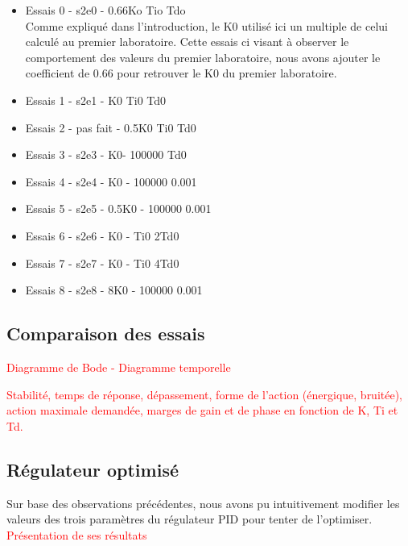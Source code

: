 \begin{itemize}
\item Essais 0 - s2e0 - 0.66Ko Tio Tdo\\
Comme expliqué dans l'introduction, le K0 utilisé ici un multiple de celui calculé au premier laboratoire. Cette essais ci visant à observer le comportement des valeurs du premier laboratoire, nous avons ajouter le coefficient de 0.66 pour retrouver le K0 du premier laboratoire.

\item Essais 1 - s2e1 - K0 Ti0 Td0

\item Essais 2 - pas fait - 0.5K0 Ti0 Td0 

\item Essais 3 - s2e3 - K0- 100000 Td0

\item Essais 4 - s2e4 - K0 - 100000 0.001

\item Essais 5 - s2e5 - 0.5K0 - 100000 0.001

\item Essais 6 - s2e6 - K0 - Ti0 2Td0

\item Essais 7 - s2e7 - K0 - Ti0 4Td0

\item Essais 8 - s2e8 - 8K0 - 100000 0.001
\end{itemize}

\subsection{Comparaison des essais}
\textcolor{red}{Diagramme de Bode - Diagramme temporelle\\}

\textcolor{red}{Stabilité, temps de réponse, dépassement, forme de l’action (énergique, bruitée), action maximale demandée, marges de gain et de phase en fonction de K, Ti et Td.}

\subsection{Régulateur optimisé}
Sur base des observations précédentes, nous avons pu intuitivement modifier les valeurs des trois paramètres du régulateur PID pour tenter de l'optimiser.\\

\textcolor{red}{Présentation de ses résultats}
